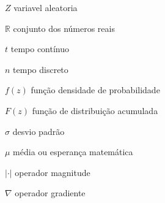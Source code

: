 \begin{basedescript}{\desclabelstyle{\pushlabel}\desclabelwidth{6em}}
\item[$Z$] variavel aleatoria%
\item[$\mathbb{R}$] conjunto dos números reais%
\item[$t$] tempo contínuo%
\item[$n$] tempo discreto%
\item[$f(z)$] função densidade de probabilidade%
\item[$F(z)$] função de distribuição acumulada%
\item[$\sigma$] desvio padrão%
\item[$\mu$] média ou esperança matemática%
\item[$|\cdot|$] operador magnitude%
\item[$\nabla$] operador gradiente%
\end{basedescript}